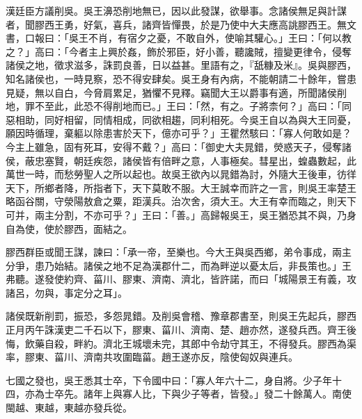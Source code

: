 \begin{pinyinscope}
漢廷臣方議削吳。吳王濞恐削地無已，因以此發謀，欲舉事。念諸侯無足與計謀者，聞膠西王勇，好氣，喜兵，諸齊皆憚畏，於是乃使中大夫應高誂膠西王。無文書，口報曰：「吳王不肖，有宿夕之憂，不敢自外，使喻其驩心。」王曰：「何以教之？」高曰：「今者主上興於姦，飾於邪臣，好小善，聽讒賊，擅變更律令，侵奪諸侯之地，徵求滋多，誅罰良善，日以益甚。里語有之，『舐糠及米』。吳與膠西，知名諸侯也，一時見察，恐不得安肆矣。吳王身有內病，不能朝請二十餘年，嘗患見疑，無以自白，今脅肩累足，猶懼不見釋。竊聞大王以爵事有適，所聞諸侯削地，罪不至此，此恐不得削地而已。」王曰：「然，有之。子將柰何？」高曰：「同惡相助，同好相留，同情相成，同欲相趨，同利相死。今吳王自以為與大王同憂，願因時循理，棄軀以除患害於天下，億亦可乎？」王瞿然駭曰：「寡人何敢如是？今主上雖急，固有死耳，安得不戴？」高曰：「御史大夫晁錯，熒惑天子，侵奪諸侯，蔽忠塞賢，朝廷疾怨，諸侯皆有倍畔之意，人事極矣。彗星出，蝗蟲數起，此萬世一時，而愁勞聖人之所以起也。故吳王欲內以晁錯為討，外隨大王後車，彷徉天下，所鄉者降，所指者下，天下莫敢不服。大王誠幸而許之一言，則吳王率楚王略函谷關，守滎陽敖倉之粟，距漢兵。治次舍，須大王。大王有幸而臨之，則天下可并，兩主分割，不亦可乎？」王曰：「善。」高歸報吳王，吳王猶恐其不與，乃身自為使，使於膠西，面結之。

膠西群臣或聞王謀，諫曰：「承一帝，至樂也。今大王與吳西鄉，弟令事成，兩主分爭，患乃始結。諸侯之地不足為漢郡什二，而為畔逆以憂太后，非長策也。」王弗聽。遂發使約齊、菑川、膠東、濟南、濟北，皆許諾，而曰「城陽景王有義，攻諸呂，勿與，事定分之耳」。

諸侯既新削罰，振恐，多怨晁錯。及削吳會稽、豫章郡書至，則吳王先起兵，膠西正月丙午誅漢吏二千石以下，膠東、菑川、濟南、楚、趙亦然，遂發兵西。齊王後悔，飲藥自殺，畔約。濟北王城壞未完，其郎中令劫守其王，不得發兵。膠西為渠率，膠東、菑川、濟南共攻圍臨菑。趙王遂亦反，陰使匈奴與連兵。

七國之發也，吳王悉其士卒，下令國中曰：「寡人年六十二，身自將。少子年十四，亦為士卒先。諸年上與寡人比，下與少子等者，皆發。」發二十餘萬人。南使閩越、東越，東越亦發兵從。


\end{pinyinscope}
